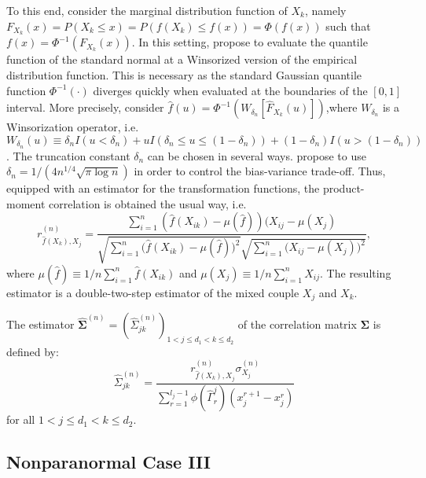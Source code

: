 To this end, consider the marginal distribution function of $X_k$, namely $F_{X_k}(x)=P(X_k \leq x) = P(f(X_k) \leq f(x)) = \Phi(f(x))$ such that $f(x) = \Phi^{-1}(F_{X_k}(x))$. In this setting, \citet{Liu09} propose to evaluate the quantile function of the standard normal at a Winsorized version of the empirical distribution function. This is necessary as the standard Gaussian quantile function $\Phi^{-1}(\cdot)$ diverges quickly when evaluated at the boundaries of the $[0,1]$ interval. More precisely, consider $\hat{f}(u) = \Phi^{-1}(W_{\delta_n}[\hat{F}_{X_k}(u)])$,where $W_{\delta_n}$ is a Winsorization operator, i.e. $W_{\delta_n}(u) \equiv \delta_n I(u < \delta_n) + u I(\delta_n \leq u \leq (1-\delta_n)) + (1-\delta_n) I(u > (1-\delta_n))$. The truncation constant $\delta_n$ can be chosen in several ways.
\citet{Liu09} propose to use $\delta_n = 1/(4n^{1/4}\sqrt{\pi\log n})$ in order to control the bias-variance trade-off. Thus, equipped with an estimator for the transformation functions, the product-moment correlation is obtained the usual way, i.e.
\begin{equation*}
    r^{(n)}_{\hat{f}(X_k),X_j} = \frac{\sum_{i=1}^n (\hat{f}(X_{ik}) - \mu(\hat{f}))(X_{ij} - \mu(X_j)}{\sqrt{\sum_{i=1}^n \Big(\hat{f}(X_{ik}) - \mu(\hat{f})\Big)^2}\sqrt{\sum_{i=1}^n \Big(X_{ij} - \mu(X_j)\Big)^2}},
\end{equation*}
where $\mu(\hat{f}) \equiv 1/n\sum_{i=1}^n \hat{f}(X_{ik})$ and $\mu(X_j) \equiv 1/n\sum_{i=1}^n X_{ij}$. The resulting estimator is a double-two-step estimator of the mixed couple $X_j$ and $X_k$.
\begin{definition}
    The estimator $\hat{\mathbf{\Sigma}}^{(n)} = (\hat{\Sigma}_{jk}^{(n)})_{1 < j \leq d_1 < k \leq d_2}$ of the correlation matrix $\mathbf{\Sigma}$ is defined by:
\begin{equation}
    \hat{\Sigma}_{jk}^{(n)} = \frac{r^{(n)}_{\hat{f}(X_k),X_j} \sigma^{(n)}_{X_j}}{\sum_{r=1}^{l_{j}-1} \phi(\hat{\Gamma}^j_r)(x_j^{r+1} - x_j^r)}
\end{equation}
    for all $1 < j \leq d_1 < k \leq d_2$.
\end{definition}



\subsection{Nonparanormal Case III}\label{sec::nonparanormal_case3} 


